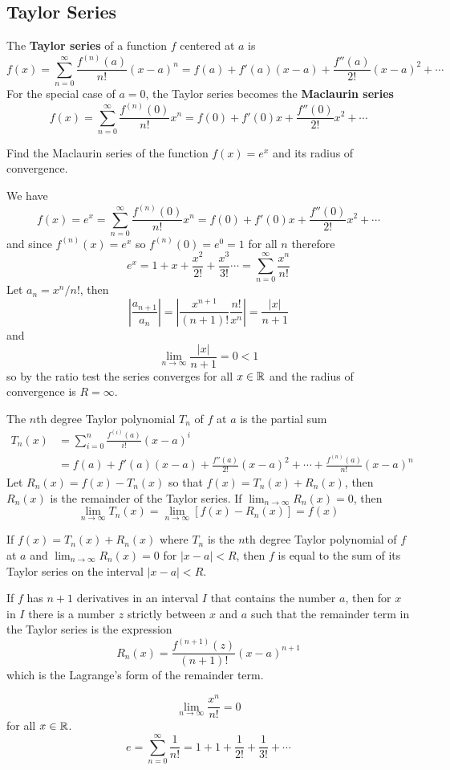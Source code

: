 \subsection{Taylor Series}
The \textbf{Taylor series} of a function \(f\) centered at \(a\) is
\[f(x)=\sum_{n=0}^{\infty}\frac{f^{(n)}(a)}{n!}(x-a)^n
=f(a)+f'(a)(x-a)+\frac{f''(a)}{2!}(x-a)^2+\cdots\]
For the special case of \(a=0\), the Taylor series becomes the
\textbf{Maclaurin series}
\[f(x)=\sum_{n=0}^{\infty}\frac{f^{(n)}(0)}{n!}x^n
=f(0)+f'(0)x+\frac{f''(0)}{2!}x^2+\cdots\]
\begin{problem}
    Find the Maclaurin series of the function \(f(x)=e^x\) and its radius of
    convergence.
\end{problem}
\begin{solution}
    We have
    \[f(x)=e^x=\sum_{n=0}^{\infty}\frac{f^{(n)}(0)}{n!}x^n
    =f(0)+f'(0)x+\frac{f''(0)}{2!}x^2+\cdots\]
    and since \(f^{(n)}(x)=e^x\) so \(f^{(n)}(0)=e^0=1\) for all \(n\)
    therefore
    \[e^x=1+x+\frac{x^2}{2!}+\frac{x^3}{3!}\cdots
    =\sum_{n=0}^\infty\frac{x^n}{n!}\]
    Let \(a_n=x^n/n!\), then
    \[\left|\frac{a_{n+1}}{a_n}\right|
    =\left|\frac{x^{n+1}}{(n+1)!}\frac{n!}{x^n}\right|=\frac{|x|}{n+1}\]
    and
    \[\lim_{n\to\infty}\frac{|x|}{n+1}=0<1\]
    so by the ratio test the series converges for all \(x\in\mathbb{R}\) and the
    radius of convergence is \(R=\infty\).
\end{solution}
The \(n\)th degree Taylor polynomial \(T_n\) of \(f\) at \(a\) is the partial
sum
\begin{align*}
    T_n(x) &= \sum_{i=0}^{n}\frac{f^{(i)}(a)}{i!}(x-a)^i \\
    &= f(a)+f'(a)(x-a)+\frac{f''(a)}{2!}(x-a)^2+\cdots
    +\frac{f^{(n)}(a)}{n!}(x-a)^n
\end{align*}
Let \(R_n(x)=f(x)-T_n(x)\) so that \(f(x)=T_n(x)+R_n(x)\), then \(R_n(x)\) is
the remainder of the Taylor series.
If \(\lim_{n\to\infty}R_n(x)=0\), then
\[\lim_{n\to\infty}T_n(x)=\lim_{n\to\infty}[f(x)-R_n(x)]=f(x)\]
\begin{theorem}
    If \(f(x)=T_n(x)+R_n(x)\) where \(T_n\) is the \(n\)th degree Taylor
    polynomial of \(f\) at \(a\) and \(\lim_{n\to\infty}R_n(x)=0\) for
    \(|x-a|<R\), then \(f\) is equal to the sum of its Taylor series on the
    interval \(|x-a|<R\).
\end{theorem}
\begin{theorem}
    If \(f\) has \(n+1\) derivatives in an interval \(I\) that contains the
    number \(a\), then for \(x\) in \(I\) there is a number \(z\) strictly
    between \(x\) and \(a\) such that the remainder term in the Taylor series
    is the expression
    \[R_n(x)=\frac{f^{(n+1)}(z)}{(n+1)!}(x-a)^{n+1}\]
    which is the Lagrange's form of the remainder term.
\end{theorem}
\[\lim_{n\to\infty}\frac{x^n}{n!}=0\] for all \(x\in\mathbb{R}\).
\[e=\sum_{n=0}^\infty\frac{1}{n!}=1+1+\frac{1}{2!}+\frac{1}{3!}+\cdots\]

